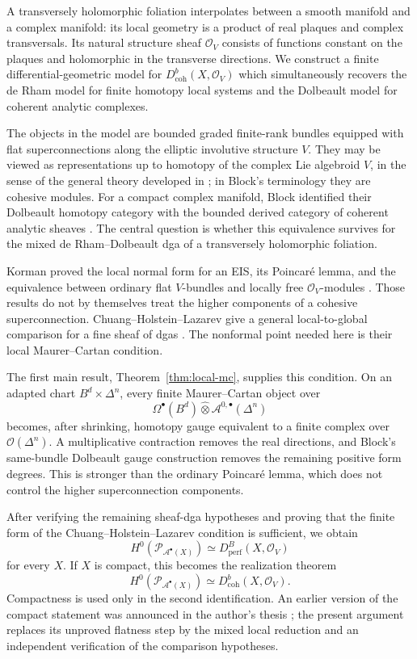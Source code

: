\documentclass[12pt]{amsart}
\theoremstyle{definition}
\theoremstyle{remark}
\numberwithin{equation}{section}
\newcommand{\CA}{\mathcal A}
\newcommand{\CO}{\mathcal O}
\begin{document}
A transversely holomorphic foliation interpolates between a smooth manifold
and a complex manifold: its local geometry is a product of real plaques and
complex transversals.  Its natural structure sheaf \(\CO_V\) consists of
functions constant on the plaques and holomorphic in the transverse
directions.  We construct a finite differential-geometric model for
\(D^b_{\mathrm{coh}}(X,\CO_V)\) which simultaneously recovers the de Rham
model for finite homotopy local systems and the Dolbeault model for coherent
analytic complexes.

The objects in the model are bounded graded finite-rank bundles equipped
with flat superconnections along the elliptic involutive structure \(V\).
They may be viewed as representations up to homotopy of the complex Lie
algebroid \(V\), in the sense of the general theory developed in
\cite{AriasAbadCrainic2012}; in Block's terminology they are cohesive
modules.  For a compact complex manifold, Block identified their Dolbeault
homotopy category with the bounded derived category of coherent analytic
sheaves \cite[Theorem~4.3]{Block2010}.  The central question is whether this
equivalence survives for the mixed de Rham--Dolbeault dga of a transversely
holomorphic foliation.

Korman proved the local normal form for an EIS, its Poincar\'e lemma, and the
equivalence between ordinary flat \(V\)-bundles and locally free
\(\CO_V\)-modules \cite[Theorems~5--7]{Korman2014}.  Those results do not by
themselves treat the higher components of a cohesive superconnection.
Chuang--Holstein--Lazarev give a general local-to-global comparison for a fine
sheaf of dgas \cite[Proposition~7.4, Theorem~7.10 and
Corollary~7.13]{CHL2021}.  The nonformal point needed here is their local
Maurer--Cartan condition.

The first main result, Theorem~\ref{thm:local-mc}, supplies this condition.
On an adapted chart \(B^d\times\Delta^n\), every finite Maurer--Cartan object
over
\[
\Omega^\bullet(B^d)\widehat\otimes
\CA^{0,\bullet}(\Delta^n)
\]
becomes, after shrinking, homotopy gauge equivalent to a finite complex over
\(\CO(\Delta^n)\).  A multiplicative contraction removes the real
directions, and Block's same-bundle Dolbeault gauge construction removes the
remaining positive form degrees.  This is stronger than the ordinary
Poincar\'e lemma, which does not control the higher superconnection
components.

After verifying the remaining sheaf-dga hypotheses and proving that the
finite form of the Chuang--Holstein--Lazarev condition is sufficient, we
obtain
\[
H^0\!\left(\mathcal P_{\CA^\bullet(X)}\right)
\simeq
D_{\mathrm{perf}}^B(X,\CO_V)
\]
for every \(X\).  If \(X\) is compact, this becomes the realization theorem
\[
H^0\!\left(\mathcal P_{\CA^\bullet(X)}\right)
\simeq
D^b_{\mathrm{coh}}(X,\CO_V).
\]
Compactness is used only in the second identification.  An earlier version
of the compact statement was announced in the author's thesis
\cite[Theorem~IV and Proposition~22.19]{ZengThesis}; the present argument
replaces its unproved flatness step by the mixed local reduction and an
independent verification of the comparison hypotheses.
\end{document}

